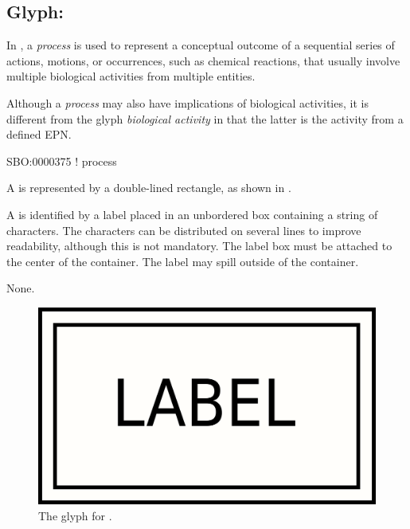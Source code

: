 
\subsection{Glyph: }
\label{sec:af:process}

In \SBGNAFLone, a \emph{process} is used to represent a conceptual outcome of a sequential series of actions, motions, or occurrences, such as chemical reactions, that usually involve multiple biological activities from multiple entities.

Although a \emph{process} may also have implications of biological activities, it is different from the glyph \emph{biological activity} in that the latter is the activity from a defined EPN.



\begin{glyphDescription}

\glyphSboTerm SBO:0000375 ! process

\glyphContainer A  is represented by a double-lined rectangle, as shown in . 

\glyphLabel A  is identified by a label placed in an unbordered box containing a string of characters.  The characters can be distributed on several lines to improve readability, although this is not mandatory.  The label box must be attached to the center of the container.  The label may spill outside of the container.

\glyphAux None.

\end{glyphDescription}

\begin{figure}[H]
  \centering
  \includegraphics[scale=0.1]{images/process}
  \caption{The \AF glyph for .}
  \label{fig:af:process}
\end{figure}
